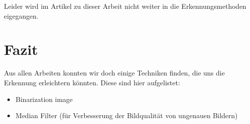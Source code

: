 Leider wird im Artikel zu dieser Arbeit nicht weiter in die Erkennungsmethoden eigegangen.

\section{Fazit}
Aus allen Arbeiten konnten wir doch einige Techniken finden, die uns die Erkennung erleichtern könnten. Diese sind hier aufgelistet:
\begin{itemize}
	\item Binarization image 
	\item Median Filter (für Verbesserung der Bildqualität von ungenauen Bildern)
\end{itemize}
